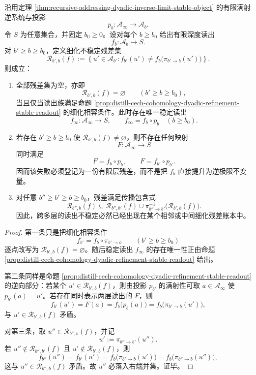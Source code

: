 \begin{proposition}[细化不稳定读出的残差账本]\label{prop:distill-grothendieck-readout-instability-residue-ledger}
沿用定理 \ref{thm:recursive-addressing-dyadic-inverse-limit-stable-object} 的有限满射逆系统与投影
\[
p_b:\mathcal A_\infty\to\mathcal A_b.
\]
令 \(S\) 为任意集合，并固定 \(b_0\ge0\)。设对每个 \(b\ge b_0\) 给出有限深度读出
\[
f_b:\mathcal A_b\longrightarrow S.
\]
对 \(b'\ge b\ge b_0\)，定义细化不稳定残差集
\[
\mathcal R_{b',b}(f)
:=
\left\{u'\in\mathcal A_{b'}:
 f_{b'}(u')\ne f_b\bigl(\pi_{b'\to b}(u')\bigr)
\right\}.
\]
则成立：
\begin{enumerate}
  \item 全部残差集为空，亦即
  \[
  \mathcal R_{b',b}(f)=\varnothing
  \qquad(b'\ge b\ge b_0),
  \]
  当且仅当读出族满足命题 \ref{prop:distill-cech-cohomology-dyadic-refinement-stable-readout} 的细化相容条件。此时存在唯一稳定读出
  \[
  f_\infty:\mathcal A_\infty\to S,
  \qquad
  f_\infty=f_b\circ p_b\quad(b\ge b_0).
  \]
  \item 若存在 \(b'\ge b\ge b_0\) 使 \(\mathcal R_{b',b}(f)\ne\varnothing\)，则不存在任何映射
  \[
  F:\mathcal A_\infty\to S
  \]
  同时满足
  \[
  F=f_b\circ p_b,\qquad F=f_{b'}\circ p_{b'}.
  \]
  因而该失败必须登记为一份有限层残差，而不是把 \(f_b\) 直接提升为逆极限不变量。
  \item 对任意 \(b''\ge b'\ge b\ge b_0\)，残差满足传播包含式
  \[
  \mathcal R_{b'',b}(f)
  \subseteq
  \mathcal R_{b'',b'}(f)
  \cup
  \pi_{b''\to b'}^{-1}\bigl(\mathcal R_{b',b}(f)\bigr).
  \]
  因此，跨多层的读出不稳定必然已经出现在某个相邻或中间细化残差账本中。
\end{enumerate}
\end{proposition}
\begin{proof}
第一条只是把细化相容条件
\[
f_{b'}=f_b\circ\pi_{b'\to b}
\qquad(b'\ge b\ge b_0)
\]
逐点改写为 \(\mathcal R_{b',b}(f)=\varnothing\)。随后稳定读出 \(f_\infty\) 的存在唯一性正由命题 \ref{prop:distill-cech-cohomology-dyadic-refinement-stable-readout} 给出。

第二条同样是命题 \ref{prop:distill-cech-cohomology-dyadic-refinement-stable-readout} 的逆向部分：若某个 \(u'\in\mathcal R_{b',b}(f)\)，则由投影 \(p_{b'}\) 的满射性可取 \(a\in\mathcal A_\infty\) 使 \(p_{b'}(a)=u'\)。若存在同时表示两层读出的 \(F\)，则
\[
f_{b'}(u')=F(a)=f_b\bigl(p_b(a)\bigr)
=f_b\bigl(\pi_{b'\to b}(u')\bigr),
\]
与 \(u'\in\mathcal R_{b',b}(f)\) 矛盾。

对第三条，取 \(u''\in\mathcal R_{b'',b}(f)\)，并记
\[
u':=\pi_{b''\to b'}(u'').
\]
若 \(u''\notin\mathcal R_{b'',b'}(f)\) 且 \(u'\notin\mathcal R_{b',b}(f)\)，则
\[
f_{b''}(u'')=f_{b'}(u')
=f_b\bigl(\pi_{b'\to b}(u')\bigr)
=f_b\bigl(\pi_{b''\to b}(u'')\bigr),
\]
这与 \(u''\in\mathcal R_{b'',b}(f)\) 矛盾。故 \(u''\) 必落入右端并集。证毕。
\end{proof}

